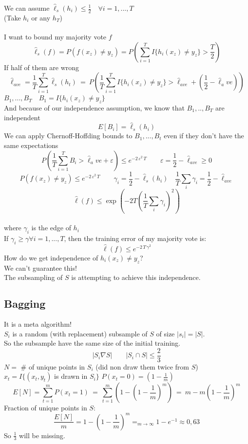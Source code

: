 \documentclass[../main.tex]{subfiles}
\begin{document}
We can assume $\hat{\ell}_s(h_i) \leq \frac{1}{2} \quad \forall i = 1,...,T$
\\
(Take $h_i$ or any $h_T$)
\\\\
I want to bound my majority vote $f$
$$
\hat{\ell}_s(f) = P \left( f(x_z) \neq y_z \right) = P\left( \sum_{i=1}^T I \{h_i(x_z) \neq y_z \} > \frac{T}{2} \right)
$$
If half of them are wrong
$$
\hat{\ell}_{ave} = \frac{1}{T} \sum_{i=1}^T \hat{\ell}_s(h_t) \ = \ P \left( \frac{1}{T} \sum_{i=1}^T I \{ h_i(x_z) \neq y_z \} > \hat{\ell}_{ave} + \left( \frac{1}{2} -\hat{\ell}_ave\right) \right)
$$
$ B_1, ..., B_T \quad B_1 = I \{ h_i (x_z) \neq y_z \}$
\\
And because of our independence assumption, we know that $B_1,..,B_T$ are independent
\\
$$
E\left[ B_i \right] = \hat{\ell}_s(h_i)
$$
We can apply Chernoff-Hoffding bounds to $B_1,...,B_t$ even if they don't have the same expectations
$$
P \left( \frac{1}{T} \sum_{i=1}^T B_i > \hat{\ell}_ave + \varepsilon \right) \leq e^{-2 \, \varepsilon^2 \, T} \qquad \varepsilon = \frac{1}{2} - \hat{\ell}_{ave} \geq 0
$$
$$
P(f(x_z) \neq y_z) \leq e^{-2 \, \varepsilon^2 \, T}
\qquad
\gamma_i = \frac{1}{2} - \hat{\ell}_s(h_i) \quad \frac{1}{T} \sum_i \gamma_i = \frac{1}{2} - \hat{\ell}_{ave} 
$$
$$
\hat{\ell}(f) \leq \exp\left(-2 T \left( \frac{1}{T} \sum_i \gamma_i \right)^2\right)
$$
\\ 
where $\gamma_i$ is the edge of $h_i$
\\
If $\gamma_i \geq \gamma \forall i = 1,...,T$, then the training error of my majority vote is: $$\hat{\ell}(f) \leq e^{-2 \, T \, \gamma^2}$$
How do we get independence of $h_i(x_z) \neq y_z$?
\\
We can't guarantee this!
\\
The subsampling of $S$ is attempting to achieve this independence.

\newpage
\subsection{Bagging}
It is a meta algorithm!
\\
$S_i$ is a random (with replacement) subsample of $S$ of size $|s_i| = |S|$.
\\ So the subsample have the same size of the initial training.
\\
$$| S_i  \nabla S| \qquad |S_i \cap S | \leq \frac{2}{3}$$
$N = $ \# of unique points in $S_i$ (did non draw them twice from $S$)
\\
$x_t = I \{ (x_t,y_t)$ is drawn in $S_i \}$ \qquad $P(x_t = 0 ) = (1- \frac{1}{m})$
$$
E [N] = \sum_{t=1}^m P(x_t=1)
\ = \ \sum_{t=1}^m (1 - (1-\frac{1}{m})^m) 
\ = \  m -m (1-\frac{1}{m})^m
$$
Fraction of unique points in $S :$
$$ \frac{E[N]}{m} = 1-(1- \frac{1}{m})^m =_{m \rightarrow \infty} 1-e^{-1} \approx 0,63$$
So $\frac{1}{3}$ will be missing.
\\
\end{document}
